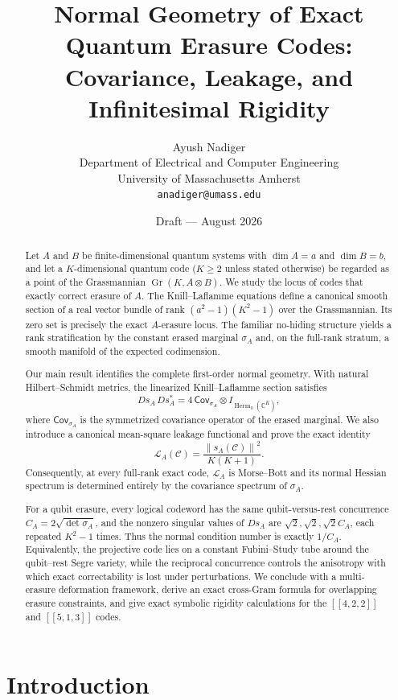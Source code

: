 \documentclass[11pt]{article}
\title{\textbf{Normal Geometry of Exact Quantum Erasure Codes:\\ Covariance, Leakage, and Infinitesimal Rigidity}}
\author{Ayush Nadiger\\
Department of Electrical and Computer Engineering\\
University of Massachusetts Amherst\\
\texttt{anadiger@umass.edu}}
\date{Draft --- August 2026}
\theoremstyle{definition}
\newcommand{\cC}{\mathcal C}
\newcommand{\cL}{\mathcal L}
\newcommand{\Gr}{\operatorname{Gr}}
\newcommand{\Herm}{\operatorname{Herm}}
\newcommand{\C}{\mathbb C}
\newcommand{\1}{\mathbf 1}
\newcommand{\norm}[1]{\left\lVert #1\right\rVert}
\begin{document}
\maketitle

\begin{abstract}
Let $A$ and $B$ be finite-dimensional quantum systems with $\dim A=a$ and $\dim B=b$, and let a $K$-dimensional quantum code ($K\ge2$ unless stated otherwise) be regarded as a point of the Grassmannian $\Gr(K,A\otimes B)$.  We study the locus of codes that exactly correct erasure of $A$.  The Knill--Laflamme equations define a canonical smooth section of a real vector bundle of rank $(a^2-1)(K^2-1)$ over the Grassmannian.  Its zero set is precisely the exact $A$-erasure locus.  The familiar no-hiding structure yields a rank stratification by the constant erased marginal $\sigma_A$ and, on the full-rank stratum, a smooth manifold of the expected codimension.

Our main result identifies the complete first-order normal geometry.  With natural Hilbert--Schmidt metrics, the linearized Knill--Laflamme section satisfies
\[
D s_A\,D s_A^{*}
=4\,\mathsf{Cov}_{\sigma_A}\otimes I_{\Herm_0(\C^K)},
\]
where $\mathsf{Cov}_{\sigma_A}$ is the symmetrized covariance operator of the erased marginal.  We also introduce a canonical mean-square leakage functional and prove the exact identity
\[
\cL_A(\cC)
=\frac{\norm{s_A(\cC)}^2}{K(K+1)}.
\]
Consequently, at every full-rank exact code, $\cL_A$ is Morse--Bott and its normal Hessian spectrum is determined entirely by the covariance spectrum of $\sigma_A$.

For a qubit erasure, every logical codeword has the same qubit-versus-rest concurrence $C_A=2\sqrt{\det\sigma_A}$, and the nonzero singular values of $D s_A$ are $\sqrt2,\sqrt2,\sqrt2 C_A$, each repeated $K^2-1$ times.  Thus the normal condition number is exactly $1/C_A$.  Equivalently, the projective code lies on a constant Fubini--Study tube around the qubit--rest Segre variety, while the reciprocal concurrence controls the anisotropy with which exact correctability is lost under perturbations.  We conclude with a multi-erasure deformation framework, derive an exact cross-Gram formula for overlapping erasure constraints, and give exact symbolic rigidity calculations for the $[[4,2,2]]$ and $[[5,1,3]]$ codes.
\end{abstract}

\section{Introduction}
\end{document}
